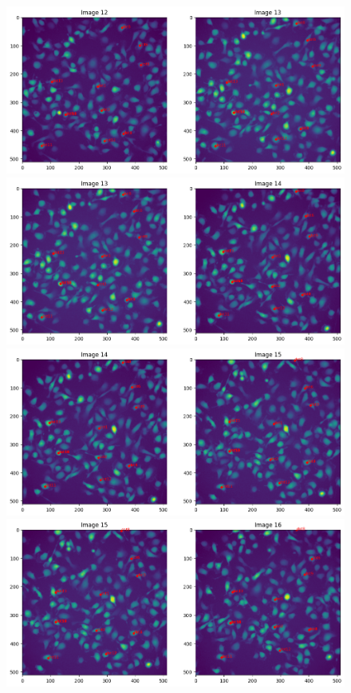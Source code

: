 \documentclass{article}
\begin{document}
\begin{figure}[h!]
\centering
\includegraphics[width=0.75\linewidth]{Report/RImages/Traces_Growth/trace-b13.png}
\includegraphics[width=0.75\linewidth]{Report/RImages/Traces_Growth/trace-b14.png}
\includegraphics[width=0.75\linewidth]{Report/RImages/Traces_Growth/trace-b15.png}
\includegraphics[width=0.75\linewidth]{Report/RImages/Traces_Growth/trace-b16.png}
\end{figure}

\clearpage
\end{document}
